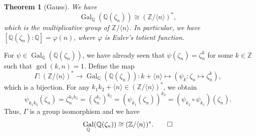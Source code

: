 \documentclass[10pt]{article}
\makeatletter
\newcommand{\Z}{\mathbb{Z}}
\newcommand{\Q}{\mathbb{Q}}
\DeclareMathOperator{\Gal}{Gal}
\theoremstyle{newstyle}
\newtheorem{thm}{Theorem}[section]
\newenvironment{pf}[1][\proofname]{\par
  \pushQED{\qed}%
  \normalfont \topsep0\p@\relax
  \trivlist
  \item[\hskip\labelsep\scshape
  #1\@addpunct{.}]\ignorespaces
}{%
  \popQED\endtrivlist\@endpefalse
}
\makeatother
\begin{document}
\begin{thm}[Gauss]
We have 
\[ \Gal_{\Q}(\Q(\zeta_n)) \cong (\Z/\langle n \rangle)^*, \] 
which is the multiplicative group of $\Z/\langle n \rangle$. In particular, we have 
$[\Q(\zeta_n) : \Q] = \varphi(n)$, where $\varphi$ is Euler's totient function. 
\end{thm}
\begin{pf}
For $\psi \in \Gal_{\Q}(\Q(\zeta_n))$, we have already seen that $\psi(\zeta_n) = \zeta_n^k$ for some 
$k \in \Z$ such that $\gcd(k, n) = 1$. Define the map 
\[ \Gamma : (\Z/\langle n \rangle)^* \to \Gal_{\Q}(\Q(\zeta_n)) : k + \langle n \rangle 
\mapsto (\psi_k : \zeta_n \mapsto \zeta_n^k), \]
which is a bijection. For any $k_1k_2 + \langle n \rangle \in (\Z/\langle n \rangle)^*$, we obtain 
\[ \psi_{k_1k_2}(\zeta_n) = \zeta_n^{k_1k_2} = (\zeta_n^{k_1})^{k_2} = 
(\psi_{k_1}(\zeta_n))^{k_2} = (\psi_{k_2} \circ \psi_{k_1})(\zeta_n). \]
Thus, $\Gamma$ is a group isomorphism and we have 
\[ \Gal_{\Q}(\Q(\zeta_n)) \cong (\Z/\langle n \rangle)^*. \qedhere \]
\end{pf}
\end{document}
